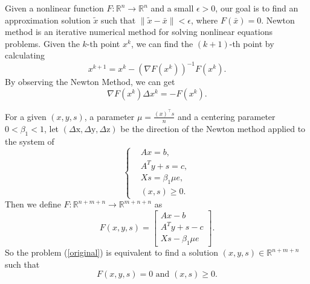 Given a nonlinear function $F:\mathbb{R}^n \rightarrow \mathbb{R}^n$ and a small $\epsilon>0$, our goal is to find an approximation solution $\tilde{x}$ such that $\lVert \tilde{x}-\bar{x} \rVert<\epsilon$, where $F(\bar{x})=0$.  Newton method is an iterative numerical method for solving nonlinear equations problems. Given the $k$-th point $x^k$, we can find the $(k+1)$-th point by calculating
\begin{equation}
x^{k+1} = x^k-(\nabla F(x^k))^{-1}F(x^k).
\end{equation}
By observing the Newton Method, we can get
\begin{equation}
\nabla F(x^k) \Delta x^k= -F(x^k).
\end{equation}

For a given $\left(x, y, s\right) $, a parameter $\mu=\frac{\left(x\right)^{\top} s}{n}$ and a centering parameter $0<\beta_1<1$, let $(\Delta \mathrm{x}, \Delta \mathrm{y}, \Delta \mathrm{z})$ be the direction of the Newton method applied to the system of
\begin{equation}\label{original}
\left\{
\begin{aligned}
& A x = b, \\
& A^T y + s = c, \\
& X s = \beta_1\mu e, \\
& (x, s) \geq 0.
\end{aligned}
\right.
\end{equation}
Then we define $F:\mathbb{R}^{n+m+n} \rightarrow \mathbb{R}^{m+n+n}$ as
\begin{equation}
F(x, y, s)=\left[\begin{array}{l}
A x-b \\
A^T y+s-c \\
X s-\beta_1\mu e
\end{array}\right].
\end{equation}
So the problem (\ref{original}) is equivalent to find a solution $(x, y, s) \in \mathbb{R}^{n+m+n}$ such that
$$
F(x, y, s)=0 \text { and } (x, s) \geq 0.
$$

